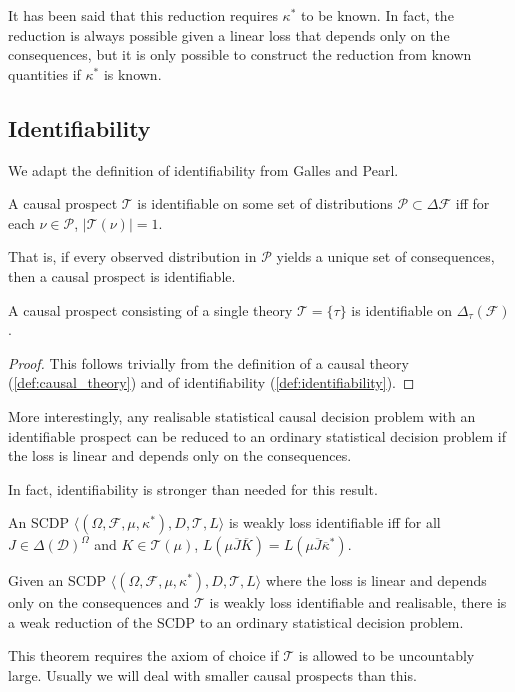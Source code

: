 It has been said that this reduction requires $\kappa^*$ to be known. In fact, the reduction is always possible given a linear loss that depends only on the consequences, but it is only possible to construct the reduction from known quantities if $\kappa^*$ is known. 

\subsection{Identifiability}

We adapt the definition of identifiability from Galles and Pearl\cite{galles_testing_2013}.
\begin{definition}[Identifiability]\label{def:identifiability}
A causal prospect $\mathscr{T}$ is identifiable on some set of distributions $\mathcal{P}\subset\Delta{\mathcal{F}}$ iff for each $\nu\in \mathcal{P}$, $|\mathscr{T}(\nu)|=1$.

That is, if every observed distribution in $\mathcal{P}$ yields a unique set of consequences, then a causal prospect is identifiable.
\end{definition}

\begin{theorem}
A causal prospect consisting of a single theory $\mathscr{T}=\{\tau\}$ is identifiable on $\Delta_{\tau}(\mathcal{F})$.
\end{theorem}

\begin{proof}
This follows trivially from the definition of a causal theory (\ref{def:causal_theory}) and of identifiability (\ref{def:identifiability}).
\end{proof}

More interestingly, any realisable statistical causal decision problem with an identifiable prospect can be reduced to an ordinary statistical decision problem if the loss is linear and depends only on the consequences.

In fact, identifiability is stronger than needed for this result.

\begin{definition}
An SCDP $\langle (\Omega,\mathcal{F},\mu,\kappa^*), D, \mathscr{T}, L\rangle$ is weakly loss identifiable iff for all $J\in \Delta(\mathcal{D})^\Omega$ and $K\in \mathscr{T}(\mu)$, $L(\mu \overline{J} \overline{K}) = L(\mu \overline{J} \overline{\kappa}^*)$.
\end{definition}

\begin{theorem}\label{th:ident_scdp_red}
Given an SCDP $\langle (\Omega,\mathcal{F},\mu,\kappa^*), D, \mathscr{T}, L\rangle$ where the loss is linear and depends only on the consequences and $\mathscr{T}$ is weakly loss identifiable and realisable, there is a weak reduction of the SCDP to an ordinary statistical decision problem.

This theorem requires the axiom of choice if $\mathscr{T}$ is allowed to be uncountably large. Usually we will deal with smaller causal prospects than this.
\end{theorem}

